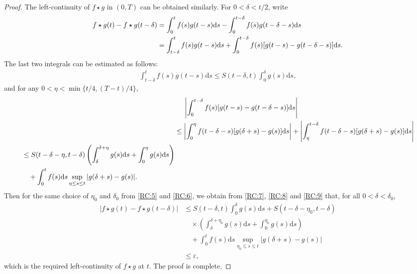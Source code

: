 \documentclass[10pt,a4paper]{amsart}
\renewcommand{\d}{{\mathrm d}}
\newcommand{\vep}{{\varepsilon}}
\begin{document}
\begin{proof}
The left-continuity of $f\star g$ in $(0,T)$ can be obtained similarly. For $0<\delta<t/2$, write
\begin{align}
f\star g(t)-f\star g(t-\delta)&=\int_0^{t} f(s)g(t-s)\d s-\int_0^{t-\delta} f(s)g(t-\delta-s)\d s\notag\\
&=\int_{t-\delta}^{t} f(s)g(t-s)\d s+\int_0^{t-\delta} f(s)[g(t-s)-g(t-\delta-s)]\d s.\label{RC:7}
\end{align}
The last two integrals can be estimated as follows: 
\begin{align}
\int_{t-\delta}^{t} f(s)g(t-s)\d s\leq S(t-\delta,t)\int_0^\delta g(s)\d s,\label{RC:8}
\end{align}
and for any $0<\eta<\min\{t/4,(T-t)/4\}$, 
\begin{align}
&\quad\;\left|\int_0^{t-\delta} f(s)[g(t-s)-g(t-\delta-s)]\d s\right|\notag\\
&\leq \left|\int_0^\eta f(t-\delta-s)[g(\delta+s)-g(s)]\d s\right|+\left|
\int_\eta^{t-\delta} f(t-\delta-s)[g(\delta+s)-g(s)]\d s\right|\notag\\
\begin{split}
&\leq S(t-\delta-\eta,t-\delta)\left(\int_{\delta}^{\delta+\eta}g(s)\d s+\int_0^{\eta}g(s)\d s\right)\\
&\quad+ \int_0^{t}f(s)\d s\sup_{\eta\leq s\leq t}|g(\delta+s)-g(s)|.\label{RC:9}
\end{split}
\end{align}
Then for the same choice of $\eta_0$ and $\delta_0$ from \eqref{RC:5} and \eqref{RC:6}, we obtain from \eqref{RC:7}, \eqref{RC:8} and \eqref{RC:9} that, for all $0<\delta<\delta_0$, 
\begin{align*}
|f\star g(t)-f\star g(t-\delta)|&\leq S(t-\delta,t)\int_0^\delta g(s)\d s+S(t-\delta-\eta_0,t-\delta)\\
&\quad \times\left(\int_{\delta}^{\delta+\eta_0}g(s)\d s+\int_0^{\eta_0}g(s)\d s\right)\\
&\quad+ \int_0^{t}f(s)\d s\sup_{\eta_0\leq s\leq t}|g(\delta+s)-g(s)|\\
&\leq \vep,
\end{align*}
which is the required left-continuity of $f\star g$ at $t$. The proof is complete.
\end{proof}
\end{document}
